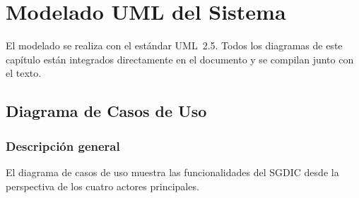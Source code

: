 \chapter{Modelado UML del Sistema}
\label{ch:diagramas}

El modelado se realiza con el estándar \ac{UML}~2.5. Todos los diagramas de este
capítulo están integrados directamente en el documento y se compilan junto con
el texto.

\section{Diagrama de Casos de Uso}

\subsection{Descripción general}
El diagrama de casos de uso muestra las funcionalidades del \ac{SGDIC} desde la
perspectiva de los cuatro actores principales.

